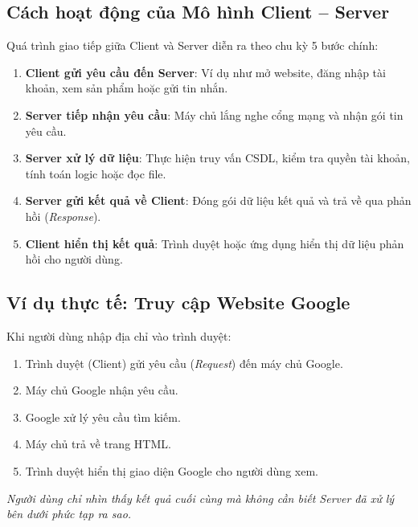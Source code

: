 \subsection{Cách hoạt động của Mô hình Client -- Server}

Quá trình giao tiếp giữa Client và Server diễn ra theo chu kỳ 5 bước chính:

\begin{conceptBox}
\begin{enumerate}[label=\textbf{\color{conceptBorder}Bước \arabic*:}, leftmargin=4.5em, itemsep=3pt, parsep=0pt, topsep=4pt]
    \item \textbf{Client gửi yêu cầu đến Server}: Ví dụ như mở website, đăng nhập tài khoản, xem sản phẩm hoặc gửi tin nhắn.
    \item \textbf{Server tiếp nhận yêu cầu}: Máy chủ lắng nghe cổng mạng và nhận gói tin yêu cầu.
    \item \textbf{Server xử lý dữ liệu}: Thực hiện truy vấn CSDL, kiểm tra quyền tài khoản, tính toán logic hoặc đọc file.
    \item \textbf{Server gửi kết quả về Client}: Đóng gói dữ liệu kết quả và trả về qua phản hồi (\textit{Response}).
    \item \textbf{Client hiển thị kết quả}: Trình duyệt hoặc ứng dụng hiển thị dữ liệu phản hồi cho người dùng.
\end{enumerate}
\end{conceptBox}

\subsection{Ví dụ thực tế: Truy cập Website Google}

Khi người dùng nhập địa chỉ  vào trình duyệt:
\begin{enumerate}[label=\textbf{\color{primaryBlue}\arabic*.}, leftmargin=2em, itemsep=2pt, parsep=0pt, topsep=2pt]
    \item Trình duyệt (Client) gửi yêu cầu (\textit{Request}) đến máy chủ Google.
    \item Máy chủ Google nhận yêu cầu.
    \item Google xử lý yêu cầu tìm kiếm.
    \item Máy chủ trả về trang HTML.
    \item Trình duyệt hiển thị giao diện Google cho người dùng xem.
\end{enumerate}
\textit{Người dùng chỉ nhìn thấy kết quả cuối cùng mà không cần biết Server đã xử lý bên dưới phức tạp ra sao.}

